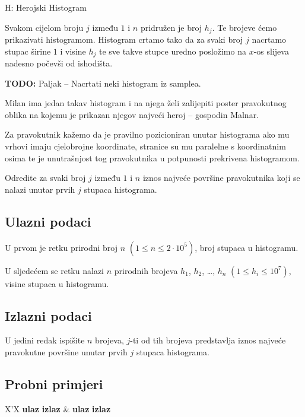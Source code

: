 \begin{statement}[
  timelimit=1 s,
  memorylimit=512 MiB,
]{H: Herojski Histogram}

Svakom cijelom broju $j$ između $1$ i $n$ pridružen je broj $h_j$. Te brojeve
ćemo prikazivati histogramom. Histogram crtamo tako da za svaki broj $j$
nacrtamo stupac širine $1$ i visine $h_j$ te sve takve stupce uredno posložimo
na $x$-os slijeva nadesno počevši od ishodišta.

\textbf{TODO:} Paljak -- Nacrtati neki histogram iz samplea.

Milan ima jedan takav histogram i na njega želi zalijepiti poster pravokutnog
oblika na kojemu je prikazan njegov najveći heroj -- gospodin Malnar.

Za pravokutnik kažemo da je pravilno pozicioniran unutar histograma ako mu
vrhovi imaju cjelobrojne koordinate, stranice su mu paralelne s koordinatnim
osima te je unutrašnjost tog pravokutnika u potpunosti prekrivena histogramom.

Odredite za svaki broj $j$ između $1$ i $n$ iznos najveće površine pravokutnika
koji se nalazi unutar prvih $j$ stupaca histograma.

\subsection*{Ulazni podaci}
U prvom je retku prirodni broj $n$ $(1 \le n \le 2 \cdot 10^5)$,  broj stupaca u
histogramu.

U sljedećem se retku nalazi $n$ prirodnih brojeva $h_1$, $h_2$, \dots, $h_n$
$(1 \le h_i \le 10^7)$, visine stupaca u histogramu.


\subsection*{Izlazni podaci}
U jedini redak ispišite $n$ brojeva, $j$-ti od tih brojeva predstavlja iznos
najveće pravokutne površine unutar prvih $j$ stupaca histograma.

\subsection*{Probni primjeri}
\begin{tabularx}{\textwidth}{X'X}
  \textbf{ulaz}
  \linespread{1}{}
  \textbf{izlaz}
  \linespread{1}{} &
  \textbf{ulaz}
  \linespread{1}{}
  \textbf{izlaz}
  \linespread{1}{}
\end{tabularx}

\end{statement}

